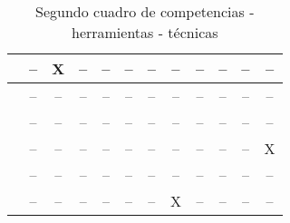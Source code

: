 \begin{landscape}
\begin{table}[H]
\begin{center}
\begin{tabular}{| c | c | c | c | c | c | c | c | c | c | c | c |}
    \hline
    \cite{Mohamed:2008a} 	& -- & X  & -- & -- & -- & -- & -- & -- & -- &  -- & -- \\
    \hline
    \cite{Gil:2011} 		& -- & --  & -- & -- & -- & -- & -- & -- & -- &  -- & -- \\
    \hline
    \cite{Velasco:2012}		& -- & --  & -- & -- & -- & -- & -- & -- & -- &  -- & -- \\
    \hline
    \cite{Borrajo:2010}		& -- & --  & -- & -- & -- & -- & -- & -- & --  & -- &  X \\
    \hline
    \cite{Bedek:2011}		& -- & --  & -- & -- & -- & -- & -- & -- & --  & -- &  -- \\
    \hline
    \cite{Palomares:2011}	& -- & --  & -- & -- & -- & -- & X  & -- & --  & -- &  -- \\
    \hline
  \end{tabular}
\end{center}
\caption{Segundo cuadro de competencias - herramientas - técnicas}
\label{tab:CuadroPreguntas2}
\end{table} 
\end{landscape}

\pagestyle{normal}




